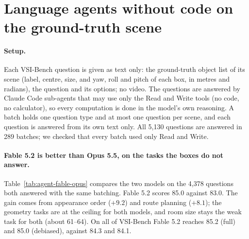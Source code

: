 
\section{Language agents without code on the ground-truth scene}
\label{sec:agent}

\paragraph{Setup.}
Each VSI-Bench question is given as text only: the ground-truth object list of its scene (label, centre, size, and
yaw, roll and pitch of each box, in metres and radians), the question and its options; no video. The questions are answered by Claude Code sub-agents
that may use only the Read and Write tools (no code, no calculator), so every computation is done in the model's
own reasoning. A batch holds one question type and at most one question per scene, and each question is answered
from its own text only. All 5,130 questions are answered in 289 batches; we checked that every batch used only
Read and Write.

\paragraph{Fable 5.2 is better than Opus 5.5, on the tasks the boxes do not answer.}
Table~\ref{tab:agent-fable-opus} compares the two models on the 4,378 questions both answered with the same
batching. Fable 5.2 scores 85.0 against 83.0. The gain comes from appearance order ($+9.2$) and route planning
($+8.1$); the geometry tasks are at the ceiling for both models, and room size stays the weak task for both
(about 61--64). On all of VSI-Bench Fable 5.2 reaches 85.2 (full) and 85.0 (debiased), against 84.3 and 84.1.

